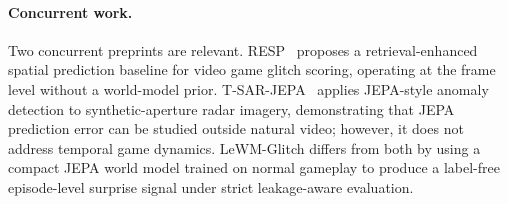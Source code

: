 \paragraph{Concurrent work.}
Two concurrent preprints are relevant. RESP~\cite{resp} proposes a retrieval-enhanced spatial
prediction baseline for video game glitch scoring, operating at the frame level without a
world-model prior. T-SAR-JEPA~\cite{tsarjepa2026} applies JEPA-style anomaly detection to
synthetic-aperture radar imagery, demonstrating that JEPA prediction error can be studied outside
natural video; however, it does not address temporal game dynamics. LeWM-Glitch differs from both
by using a compact JEPA world model trained on normal gameplay to produce a label-free
episode-level surprise signal under strict leakage-aware evaluation.
